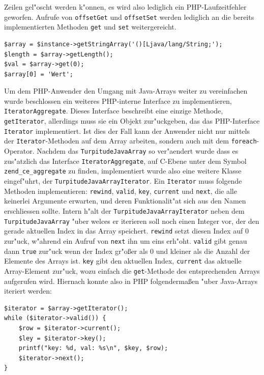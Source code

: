 Zeilen gel"oscht werden k"onnen, es wird also lediglich ein PHP-Laufzeitfehler geworfen. Aufrufe von \texttt{offsetGet} und \texttt{offsetSet} werden lediglich
an die bereits implementierten Methoden \texttt{get} und \texttt{set} weitergereicht. 
\begin{lstlisting}[caption=Zugriff auf ein Java-Array]
$array = $instance->getStringArray('()[Ljava/lang/String;');
$length = $array->getLength();
$val = $array->get(0);
$array[0] = 'Wert';
\end{lstlisting}
Um dem PHP-Anwender den Umgang mit Java-Arrays weiter zu vereinfachen wurde beschlossen ein weiteres PHP-interne Interface zu implementieren, \texttt{IteratorAggregate}.
Dieses Interface beschreibt eine einzige Methode, \texttt{getIterator}, allerdings muss sie ein Objekt zur"uckgeben, das das PHP-Interface \texttt{Iterator} implementiert.
Ist dies der Fall kann der Anwender nicht nur mittels der \texttt{Iterator}-Methoden auf dem Array arbeiten, sondern auch mit dem \texttt{foreach}-Operator. Nachdem
das \texttt{TurpitudeJavaArray} so ver"aendert wurde dass es zus"atzlich das Interface \texttt{IteratorAggregate}, auf C-Ebene unter dem Symbol \texttt{zend\_ce\_aggregate}
zu finden, implementiert wurde also eine weitere Klasse eingef"uhrt, der \texttt{TurpitudeJavaArrayIterator}. Ein \texttt{Iterator} muss folgende Methoden implementieren:
\texttt{rewind}, \texttt{valid}, \texttt{key}, \texttt{current} und \texttt{next}, die alle keinerlei Argumente erwarten, und deren Funktionalit"at sich aus den Namen erschliessen 
sollte. Intern h"alt der \texttt{TurpitudeJavaArrayIterator} neben dem \texttt{TurpitudeJavaArray} "uber welces er iterieren soll noch einen Integer vor, der den
gerade aktuellen Index in das Array speichert. \texttt{rewind} setzt diesen Index auf 0 zur"uck, w"ahrend ein Aufruf von \texttt{next} ihn um eins erh"oht. \texttt{valid} gibt
genau dann \texttt{true} zur"uck wenn der Index gr"o\ss er als 0 und kleiner als die Anzahl der Elemente des Arrays ist. \texttt{key} gibt den aktuellen Index, \texttt{current}
das aktuelle Array-Element zur"uck, wozu einfach die \texttt{get}-Methode des entsprechenden Arrays aufgerufen wird. Hiernach konnte also in PHP folgenderma\ss en "uber Java-Arrays
iteriert werden:
\begin{lstlisting}[caption=Iterieren "uber ein Java-Array]
$iterator = $array->getIterator();
while ($iterator->valid()) {
    $row = $iterator->current();
    $ley = $iterator->key();
    printf("key: %d, val: %s\n", $key, $row);
    $iterator->next();
}
\end{lstlisting}
